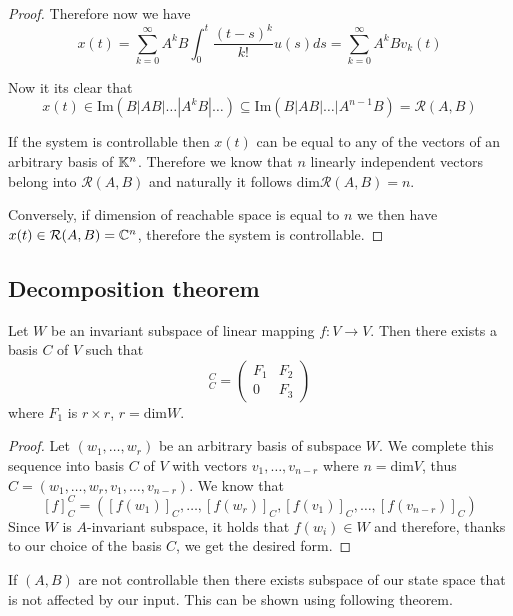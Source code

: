 \begin{proof}
	Therefore now we have $$x(t)=\sum^\infty_{k=0}A^kB\int^t_0\frac{(t-s)^k}{k!}u(s)ds=\sum^\infty_{k=0}A^kBv_k(t)$$ 

	Now it its clear that $$x(t) \in \text{Im}(B|AB|\ldots|A^kB|\ldots)\subseteq \text{Im}(B|AB|\ldots|A^{n-1}B)=\mathcal{R}(A,B)$$ 
	
	If the system is controllable then $x(t)$ can be equal to any of the vectors of an arbitrary basis of $\mathbb{K}^n$. Therefore we know that $n$ linearly independent vectors belong into $\mathcal{R}(A,B)$ and naturally it follows $\text{dim}\mathcal{R}(A,B)=n$.

	Conversely, if dimension of reachable space is equal to $n$ we then have $x(t)\in\mathcal{R}(A,B)=\mathbb{C}^n$, therefore the system is controllable.
\end{proof}

\subsection{Decomposition theorem}

\begin{lemma}
	\label{lem:invsubspc}
	Let $W$ be an invariant subspace of linear mapping $f\colon V \rightarrow V$. Then there exists a basis $C$ of $V$ such that 
	\begin{equation*}
		[f]^C_C=
		\begin{pmatrix}
			F_1 & F_2 \\
			0   & F_3 
		\end{pmatrix}
	\end{equation*}
	where $F_1$ is $r\times r$, $r=\text{dim}W$.
\end{lemma}

\begin{proof}
	Let $(w_1,\ldots,w_r)$ be an arbitrary basis of subspace $W$. We complete this sequence into basis $C$ of $V$ with vectors $v_1,\ldots,v_{n-r}$ where $n=\text{dim}V$, thus $C=(w_1,\ldots,w_r,v_1,\ldots,v_{n-r})$. We know that $$[f]^C_C=([f(w_1)]_C,\ldots,[f(w_r)]_C,[f(v_1)]_C,\ldots,[f(v_{n-r})]_C)$$ Since $W$ is $A$-invariant subspace, it holds that $f(w_i)\in W$ and therefore, thanks to our choice of the basis $C$, we get the desired form.
\end{proof}

If $(A,B)$ are not controllable then there exists subspace of our state space that is not affected by our input. This can be shown using following theorem.

